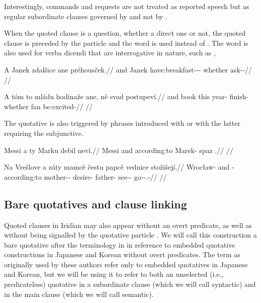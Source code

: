 Interestingly, commands and requests are not treated as reported speech but as
regular subordinate clauses governed by  and not by .

When the quoted clause is a question, whether a direct one or not, the quoted
clause is preceded by the particle  and the word
 is used instead of . The word  is also
used for verba dicendi that are interrogative in nature, such as
,

\pex
\begingl
  \gla A Janek zdalšice ane préhousček.//
  \glb and Janek have:breakfast-\Av{}-\Pf{}-\Quot{} whether ask-\Av{}-\Pf{}//
  \glft {}//
\endgl
\xe

\pex
\begingl
  \gla A tóm to mládu hodinaže ane, ně svad postupeví.//
  \glb and book this year-\Ins{} finish- whether \Pl{} fan be:excited-\Cont{}//
  \glft {}//
\endgl
\xe

The quotative is also triggered by phrases introduced with  or  with the latter requiring the subjunctive. 

\pex
\begingl
  \gla Messi a ty Marku debil neví.//
  \glb Messi and according:to Marek-\Ins{} spaz \Cop{}.\Sbj{}//
  \glft {}//
\endgl
\xe

\pex
\begingl
  \gla Na Vrešlove a záty mamcě čestu papcě vednice stožišejí.//
  \glb \Loc{} Wrocław-\Acc{} and \Neg{}-according:to mother-\Dim{}-\Gen{} desire-\Ins{} father-\Gen{} see-\Pv{}-\SupP{} go-\Av{}-\Subj{}.\Pf{}-\Quot{}//
  \glft {}//
\endgl
\xe


\subsection{Bare quotatives and clause linking}

Quoted clauses in Iridian may also appear without an overt predicate, as well as
without being signalled by the quotative particle . We will call this
construction a {\sc bare quotative} after the terminology in
\textcite{tomioka2019} in reference to embedded quotative constructions in
Japanese and Korean without overt predicates. The term as originally used by
these authors refer only to embedded quotatives in Japanese and Korean, but we
will be using it to refer to both an unselected (i.e., predicateless) quotative
in a subordinate clause (which we will call {\sc syntactic}) and in the main
clause (which we will call {\sc semantic}).

